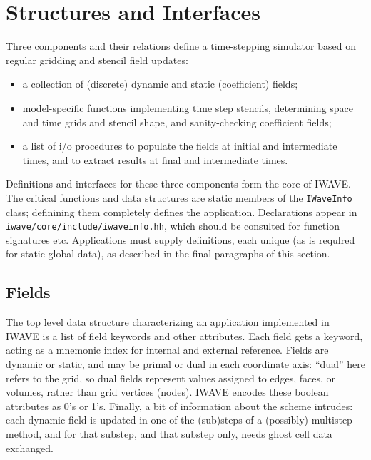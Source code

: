 \section{Structures and Interfaces}
Three components and their relations define a time-stepping simulator
based on regular gridding and stencil field updates:
\begin{itemize}
\item a collection of (discrete) dynamic and static (coefficient) fields;
\item model-specific functions implementing time step stencils, 
  determining space and time grids and stencil shape, and
  sanity-checking coefficient fields;
\item a list of i/o procedures to populate the fields at initial and
  intermediate times, and to extract results at final and intermediate
  times.
\end{itemize}
Definitions and interfaces for these three components form the core of
IWAVE. The critical functions and data structures are static members of the {\tt IWaveInfo} class;
definining them completely defines the application. Declarations
appear in \\{\tt iwave/core/include/iwaveinfo.hh}, which should be
consulted for function signatures etc. Applications must supply
definitions, each unique (as is requlred for static global data), as
described in the final paragraphs of this section.

\subsection{Fields}
The top level data structure characterizing an application implemented
in IWAVE is a list of field keywords and other attributes. Each field
gets a keyword, acting as a mnemonic index for internal and external
reference. Fields are dynamic or static, and may be primal or dual in
each coordinate axis: ``dual'' here refers to the grid, so dual fields
represent values assigned to edges, faces, or volumes, rather than
grid vertices (nodes). IWAVE encodes these boolean attributes as 0's
or 1's. Finally, a bit of information about the scheme intrudes: each
dynamic field is updated in one of the (sub)steps of a (possibly)
multistep method, and for that substep, and that substep only, needs
ghost cell data exchanged.

